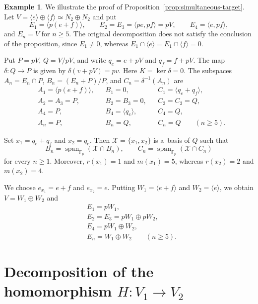 \documentclass[11pt]{article}
\theoremstyle{definition}
\newtheorem{ex}[thm]{Example}
\begin{document}
\begin{ex}
	We illustrate the proof of Proposition~\ref{prop:simultaneous-target}.
	Let $V=\langle e\rangle\oplus\langle f\rangle\simeq N_2\oplus N_2$
	and put
	$$
	E_1=\langle p(e+f)\rangle,\qquad
	E_2=E_3=\langle pe,pf\rangle=pV,\qquad
	E_4=\langle e,pf\rangle,
	$$
	and $E_n=V$ for $n\geq5$.
	The original decomposition does not satisfy the conclusion
	of the proposition, since $E_1\neq0$, whereas
	$E_1\cap\langle e\rangle=E_1\cap\langle f\rangle=0$.
	
	Put $P=pV$, $Q=V/pV$, and write $q_e=e+pV$ and $q_f=f+pV$.
	The map $\delta:Q\to P$ is given by $\delta(v+pV)=pv$.
	Here $K=\ker\delta=0$. The subspaces
	$A_n=E_n\cap P$, $B_n=(E_n+P)/P$, and
	$C_n=\delta^{-1}(A_n)$ are
	$$
	\begin{aligned}
		&A_1=\langle p(e+f)\rangle,
		&&B_1=0,
		&&C_1=\langle q_e+q_f\rangle,\\
		&A_2=A_3=P,
		&&B_2=B_3=0,
		&&C_2=C_3=Q,\\
		&A_4=P,
		&&B_4=\langle q_e\rangle,
		&&C_4=Q,\\
		&A_n=P,
		&&B_n=Q,
		&&C_n=Q \qquad(n\geq5).
	\end{aligned}
	$$
	
	Set $x_1=q_e+q_f$ and $x_2=q_e$. Then
	$\mathcal X=\{x_1,x_2\}$ is a~basis of $Q$ such that
	$$
	B_n=\operatorname{span}_{\mathbb F_p}(\mathcal X\cap B_n),
	\qquad
	C_n=\operatorname{span}_{\mathbb F_p}(\mathcal X\cap C_n)
	$$
	for every $n\geq1$. Moreover, $r(x_1)=1$ and $m(x_1)=5$,
	whereas $r(x_2)=2$ and $m(x_2)=4$.
	
	We choose $e_{x_1}=e+f$ and $e_{x_2}=e$.
	Putting $W_1=\langle e+f\rangle$ and $W_2=\langle e\rangle$,
	we obtain $V=W_1\oplus W_2$ and
	$$
	\begin{aligned}
		&E_1=pW_1,\\
		&E_2=E_3=pW_1\oplus pW_2,\\
		&E_4=pW_1\oplus W_2,\\
		&E_n=W_1\oplus W_2 \qquad(n\geq5).
	\end{aligned}
	$$
\end{ex}



\section{Decomposition of the homomorphism $H:V_1\to V_2$}\label{sec-decomposition-of-H}
\end{document}
